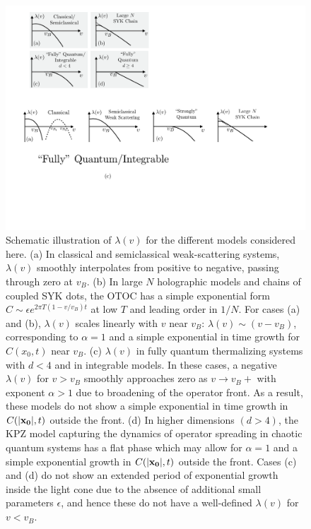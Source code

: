 \documentclass[aps,prl,reprint,superscriptaddress, longbibliography]{revtex4-1}
\newcommand{\vb}{v_B}
\newcommand{\lamv}{\lambda(v)}
\begin{document}
\begin{figure}[t]
  \includegraphics[width=\columnwidth]{lamvforms2.pdf}
  \caption{\label{fig:lamvforms} Schematic illustration of $\lambda(v)$ for the different models considered here. (a) In classical and semiclassical weak-scattering systems, $\lamv$ smoothly interpolates from positive to negative, passing through zero at $\vb$. (b) In large $N$ holographic models and chains of coupled SYK dots, the OTOC has a simple exponential form $C \sim \epsilon e^{2\pi T(1-v/\vb)t}$ at low $T$ and leading order in $1/N$. For cases (a) and (b), $\lamv$ scales linearly with $v$ near $\vb$: $\lamv \sim (v-\vb)$, corresponding to $\alpha =1 $ and a simple exponential in time growth for $C(x_0,t)$ near $\vb$. (c) $\lamv$ in fully quantum thermalizing systems with $d<4$ and in integrable models. In these cases, a negative $\lamv$ for $v>\vb$ smoothly approaches zero as $v\rightarrow \vb+$ with exponent $\alpha >1$ due to broadening of the operator front. As a result, these models do not show a simple exponential in time growth in $C(|{\bf x_0}|,t)$ outside the front. (d) In higher dimensions $(d>4)$, the KPZ model capturing the dynamics of operator spreading in chaotic quantum systems has a flat phase which may allow for $\alpha = 1$ and a simple exponential growth in $C(|{\bf x_0}|,t)$ outside the front. Cases (c) and (d) do not show an extended period of exponential growth inside the light cone due to the absence of additional small parameters $\epsilon$, and hence these do not have a well-defined $\lambda(v)$ for $v < \vb$.}
\end{figure}
\end{document}
